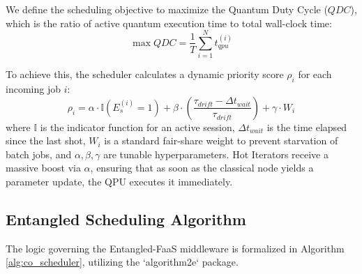 \documentclass[conference]{IEEEtran}
\begin{document}
We define the scheduling objective to maximize the Quantum Duty Cycle ($QDC$), which is the ratio of active quantum execution time to total wall-clock time:
\begin{equation}
    \max QDC = \frac{1}{T} \sum_{i=1}^{N} t_{qpu}^{(i)}
\end{equation}

To achieve this, the scheduler calculates a dynamic priority score $\rho_i$ for each incoming job $i$:
\begin{equation}
    \rho_i = \alpha \cdot \mathbb{I}(E_s^{(i)} = 1) + \beta \cdot \left( \frac{\tau_{drift} - \Delta t_{wait}}{\tau_{drift}} \right) + \gamma \cdot W_i
\end{equation}
where $\mathbb{I}$ is the indicator function for an active session, $\Delta t_{wait}$ is the time elapsed since the last shot, $W_i$ is a standard fair-share weight to prevent starvation of batch jobs, and $\alpha, \beta, \gamma$ are tunable hyperparameters. Hot Iterators receive a massive boost via $\alpha$, ensuring that as soon as the classical node yields a parameter update, the QPU executes it immediately.

\subsection{Entangled Scheduling Algorithm}
The logic governing the Entangled-FaaS middleware is formalized in Algorithm \ref{alg:co_scheduler}, utilizing the `algorithm2e` package.

\begin{algorithm}[hbt!]
\caption{Calibration-Aware Dual-Resource Scheduling}
\label{alg:co_scheduler}
\LinesNumbered
{} \label{alg:in}
 \label{alg:out}
 \label{alg:endwhile}
\end{algorithm}
\end{document}
